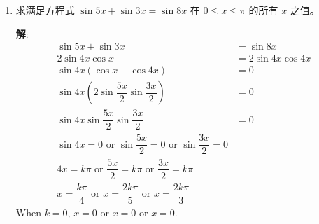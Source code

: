 \documentclass{report}
\newcommand{\sol}{\vspace{0.2cm}\textbf{解}:}
\begin{document}
\begin{enumerate}[leftmargin=*]
\begin{enumerate}
\begin{enumerate}
                \item $\cos 3 \theta+2 \cos \theta=0$。

                \sol{}
                \begin{align*}
                    \cos 3 \theta+2 \cos \theta & = 0\\
                    \cos 2\theta\cos\theta - \sin 2\theta\sin\theta + 2\cos\theta &= 0\\
                    (1 - 2\sin^2\theta)\cos\theta - 2\sin^2 \theta\cos\theta + 2\cos\theta &= 0\\
                    3\cos\theta - 4\sin^2\theta\cos\theta &= 0\\
                    \cos\theta(3 - 4\sin^2\theta) &= 0\\
                    \cos\theta = 0 \text{ or } 3 - 4(1 - \cos^2\theta) &= 0\\
                    \cos\theta = 0 \text{ or } \cos^2\theta &= \dfrac{1}{4}\\
                    \cos\theta = 0 \text{ or } 2\cos^2\theta &= \dfrac{1}{2}\\
                    \cos\theta = 0 \text{ or } 1 - 2\cos^2\theta &= -\dfrac{1}{2}\\
                    \cos\theta = 0 \text{ or } \cos2\theta &= -\dfrac{1}{2}\\
                    \theta &= k\pi + \dfrac{\pi}{2} \text{ or } 2\theta = 2k\pi \pm \dfrac{2\pi}{3}\\
                    \theta &= k\pi + \dfrac{\pi}{2} \text{ or } \theta = k\pi \pm \dfrac{\pi}{3} \quad \text{where } k \in \mathbb{Z} & \blacksquare
                \end{align*}
            \end{enumerate}
        \end{enumerate}
        
        \item 求满足方程式 $\sin 5 x+\sin 3 x=\sin 8 x$ 在 $0 \leq x \leq \pi$ 的所有 $x$ 之值。
        
        \sol{}
        \begin{align*}
            \sin 5 x + \sin 3 x &= \sin 8 x\\
            2\sin 4x\cos x &= 2\sin 4x\cos 4x\\
            \sin 4x(\cos x - \cos 4x) &= 0\\
            \sin 4x\left(2\sin \dfrac{5x}{2}\sin \dfrac{3x}{2}\right) &= 0\\
            \sin 4x\sin \dfrac{5x}{2}\sin \dfrac{3x}{2} &= 0\\
            \sin 4x = 0 \text{ or } \sin \dfrac{5x}{2} = 0 \text{ or } \sin \dfrac{3x}{2} = 0\\
            4x = k\pi \text{ or } \dfrac{5x}{2} = k\pi \text{ or } \dfrac{3x}{2} = k\pi\\
            x = \dfrac{k\pi}{4} \text{ or } x = \dfrac{2k\pi}{5} \text{ or } x = \dfrac{2k\pi}{3}
        \end{align*}
        When $k = 0$, $x = 0$ or $x = 0$ or $x = 0$.


\end{enumerate}
\end{document}
